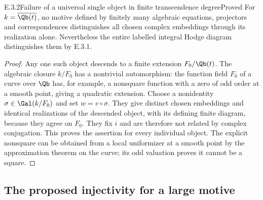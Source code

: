 \begin{result}{E.3.2}{Failure of a universal single object in finite transcendence degree}{Proved}
For $k=\overline{\Qb(t)}$, no motive defined by finitely many algebraic equations, projectors and correspondences distinguishes all chosen complex embeddings through its realization alone. Nevertheless the entire labelled integral Hodge diagram distinguishes them by E.3.1.
\end{result}
\begin{proof}
Any one such object descends to a finite extension $F_0/\Qb(t)$. The algebraic closure $k/F_0$ has a nontrivial automorphism: the function field $F_0$ of a curve over $\Qb$ has, for example, a nonsquare function with a zero of odd order at a smooth point, giving a quadratic extension. Choose a nonidentity $\sigma\in\Gal(k/F_0)$ and set $w=v\circ\sigma$. They give distinct chosen embeddings and identical realizations of the descended object, with its defining finite diagram, because they agree on $F_0$. They fix $i$ and are therefore not related by complex conjugation. This proves the assertion for every individual object. The explicit nonsquare can be obtained from a local uniformizer at a smooth point by the approximation theorem on the curve; its odd valuation proves it cannot be a square.
\end{proof}

\subsection{The proposed injectivity for a large motive}

